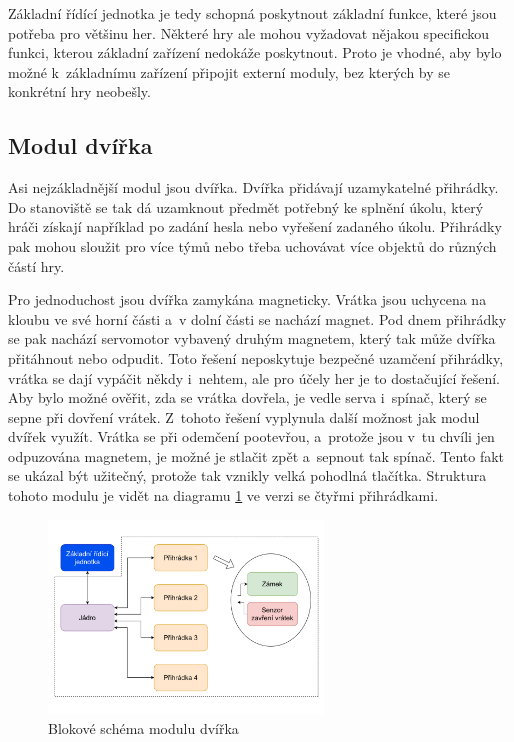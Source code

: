 Základní řídící jednotka je tedy schopná poskytnout základní funkce, které jsou potřeba pro většinu her.
Některé hry ale mohou vyžadovat nějakou specifickou funkci, kterou základní zařízení nedokáže poskytnout.
Proto je vhodné, aby bylo možné k~základnímu zařízení připojit externí moduly, bez kterých by se konkrétní hry neobešly.

\subsection{Modul dvířka}
Asi nejzákladnější modul jsou dvířka.
Dvířka přidávají uzamykatelné přihrádky.
Do stanoviště se tak dá uzamknout předmět potřebný ke splnění úkolu, který hráči získají například po zadání hesla nebo vyřešení zadaného úkolu.
Přihrádky pak mohou sloužit pro více týmů nebo třeba uchovávat více objektů do různých částí hry.

Pro jednoduchost jsou dvířka zamykána magneticky.
Vrátka jsou uchycena na kloubu ve své horní části a~v dolní části se nachází magnet.
Pod dnem přihrádky se pak nachází servomotor vybavený druhým magnetem, který tak může dvířka přitáhnout nebo odpudit.
Toto řešení neposkytuje bezpečné uzamčení přihrádky, vrátka se dají vypáčit někdy i~nehtem, ale pro účely her je to dostačující řešení.
Aby bylo možné ověřit, zda se vrátka dovřela, je vedle serva i~spínač, který se sepne při dovření vrátek.
Z~tohoto řešení vyplynula další možnost jak modul dvířek využít.
Vrátka se při odemčení pootevřou, a~protože jsou v~tu chvíli jen odpuzována magnetem, je možné je stlačit zpět a~sepnout tak spínač.
Tento fakt se ukázal být užitečný, protože tak vznikly velká pohodlná tlačítka.
Struktura tohoto modulu je vidět na diagramu \ref{fig:diagram_dvirka} ve verzi se čtyřmi přihrádkami.

\begin{figure}[h]
    \centering
    \includegraphics[width=0.65\textwidth]{text/TeoretickyUvod/AplikaceHernichZarizeni/diagram/Dvirka.drawio.pdf}
    \caption{Blokové schéma modulu dvířka}
    \label{fig:diagram_dvirka}
\end{figure}
 
